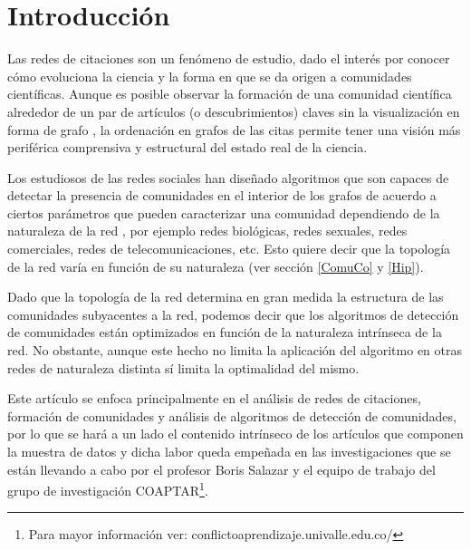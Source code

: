 \documentclass[12pt,letter]{article}
\begin{document}
\doublespace


\section{Introducción}
Las redes de citaciones son un fenómeno de estudio, dado el interés por conocer cómo evoluciona la ciencia y la forma en que se da origen a comunidades científicas. Aunque es posible observar la formación de una comunidad científica alrededor de un par de artículos (o descubrimientos) claves sin la visualización en forma de grafo \citep{Kuhn,Salazar1}, la ordenación en grafos de las citas permite tener una visión más periférica comprensiva y estructural del estado real de la ciencia. 

\vspace{0.5cm}


Los estudiosos de las redes sociales han diseñado algoritmos que son capaces de detectar la presencia de comunidades en el interior de los grafos de acuerdo a ciertos parámetros que pueden caracterizar una comunidad dependiendo de la naturaleza de la red \citep{Labatut}, por ejemplo redes biológicas, redes sexuales, redes comerciales, redes de telecomunicaciones, etc. Esto quiere decir que la topología de la red varía en función de su naturaleza (ver sección \ref{ComuCo} y \ref{Hip}).

\vspace{0.5cm}

Dado que la topología de la red determina en gran medida la estructura de las comunidades subyacentes a la red, podemos decir que los algoritmos de detección de comunidades están optimizados en función de la naturaleza intrínseca de la red. No obstante, aunque este hecho no limita la aplicación del algoritmo en otras redes de naturaleza distinta sí limita la optimalidad del mismo.

\vspace{0.5cm}

Este artículo se enfoca principalmente en el análisis de redes de citaciones, formación de comunidades y análisis de algoritmos de detección de comunidades, por lo que se hará a un lado el contenido intrínseco de los artículos que componen la muestra de datos y dicha labor queda empeñada en las investigaciones que se están llevando a cabo por el profesor Boris Salazar y el equipo de trabajo del grupo de investigación COAPTAR\footnote{Para mayor información ver: conflictoaprendizaje.univalle.edu.co/}.

\vspace{0.5cm}
\end{document}
